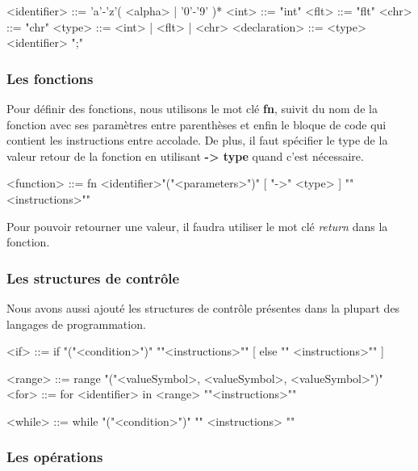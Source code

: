 \documentclass[a4paper]{article}%
\begin{document}
\begin{grammar}
<identifier> ::= 'a'-'z'( <alpha> | '0'-'9' )*
<int> ::= "int"
<flt> ::= "flt"
<chr> ::= "chr"
<type> ::= <int> | <flt> | <chr>
<declaration> ::= <type> <identifier> ";"
\end{grammar}\leavevmode\newline

\subsubsection{Les fonctions}

Pour définir des fonctions, nous utilisons le mot clé \textbf{fn}, suivit du nom
de la fonction avec ses paramètres entre parenthèses et enfin le bloque de code
qui contient les instructions entre accolade. De plus, il faut spécifier le type
de la valeur retour de la fonction en utilisant \textbf{-> type} quand c'est
nécessaire.

\begin{grammar}
<function> ::= fn <identifier>"("<parameters>")" [ "->" <type> ] "{"<instructions>"}"
\end{grammar}\leavevmode\newline

Pour pouvoir retourner une valeur, il faudra utiliser le mot clé \textit{return}
dans la fonction.

\subsubsection{Les structures de contrôle}

Nous avons aussi ajouté les structures de contrôle présentes dans la plupart des
langages de programmation.

\begin{grammar}
<if> ::= if "("<condition>")" "{"<instructions>"}" [ else "{" <instructions>"}" ]

<range> ::= range "("<valueSymbol>, <valueSymbol>, <valueSymbol>")"
<for> ::= for <identifier> in <range> "{"<instructions>"}"

<while> ::= while "("<condition>")" "{" <instructions> "}"
\end{grammar}\leavevmode\newline

\subsubsection{Les opérations}
\end{document}
